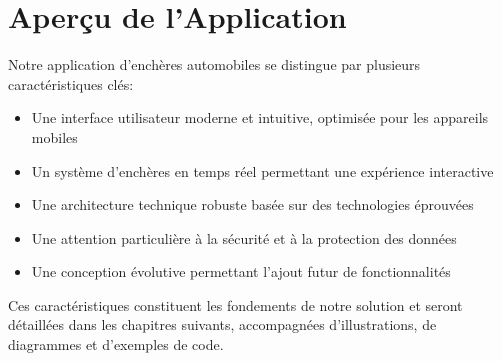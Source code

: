 \section{Aperçu de l'Application}

Notre application d'enchères automobiles se distingue par plusieurs caractéristiques clés:

\begin{itemize}
    \item Une interface utilisateur moderne et intuitive, optimisée pour les appareils mobiles
    \item Un système d'enchères en temps réel permettant une expérience interactive
    \item Une architecture technique robuste basée sur des technologies éprouvées
    \item Une attention particulière à la sécurité et à la protection des données
    \item Une conception évolutive permettant l'ajout futur de fonctionnalités
\end{itemize}

Ces caractéristiques constituent les fondements de notre solution et seront détaillées dans les chapitres suivants, accompagnées d'illustrations, de diagrammes et d'exemples de code. 